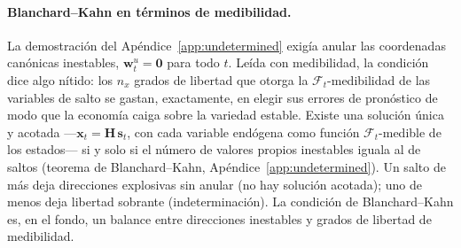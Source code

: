 \documentclass[11pt,a4paper]{report}
\begin{document}
\paragraph{Blanchard--Kahn en términos de medibilidad.} La demostración del
Apéndice~\ref{app:undetermined} exigía anular las coordenadas canónicas inestables,
$\mathbf{w}^u_t=\mathbf{0}$ para todo $t$. Leída con medibilidad, la condición dice
algo nítido: los $n_x$ grados de libertad que otorga la $\mathcal{F}_t$-medibilidad de
las variables de salto se gastan, exactamente, en elegir sus errores de pronóstico de
modo que la economía caiga sobre la variedad estable. Existe una solución única y
acotada ---$\mathbf{x}_t=\mathbf{H}\,\mathbf{s}_t$, con cada variable endógena como
función $\mathcal{F}_t$-medible de los estados--- si y solo si el número de valores
propios inestables iguala al de saltos (teorema de Blanchard--Kahn,
Apéndice~\ref{app:undetermined}). Un
salto de más deja direcciones explosivas sin anular (no hay solución acotada); uno de
menos deja libertad sobrante (indeterminación). La condición de Blanchard--Kahn es, en
el fondo, un balance entre direcciones inestables y grados de libertad de
medibilidad.
\end{document}
